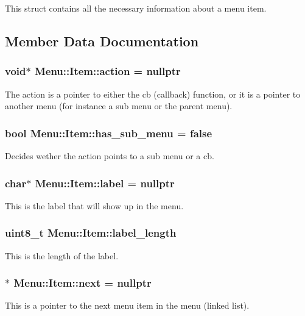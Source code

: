 This struct contains all the necessary information about a menu item. 

\subsection{Member Data Documentation}
\hypertarget{struct_menu_1_1_item_a247e140fed2addf80986ba5a3506b9dd}{
\subsubsection[{action}]{\setlength{\rightskip}{0pt plus 5cm}void$\ast$ Menu\-::\-Item\-::action = nullptr}}\label{struct_menu_1_1_item_a247e140fed2addf80986ba5a3506b9dd}
The action is a pointer to either the cb (callback) function, or it is a pointer to another menu (for instance a sub menu or the parent menu). \hypertarget{struct_menu_1_1_item_a5c9895a137458b9a12dafd447ac7430b}{
\subsubsection[{has\-\_\-sub\-\_\-menu}]{\setlength{\rightskip}{0pt plus 5cm}bool Menu\-::\-Item\-::has\-\_\-sub\-\_\-menu = false}}\label{struct_menu_1_1_item_a5c9895a137458b9a12dafd447ac7430b}
Decides wether the action points to a sub menu or a cb. \hypertarget{struct_menu_1_1_item_a378723382fc64c752a85ffe6fec9707e}{
\subsubsection[{label}]{\setlength{\rightskip}{0pt plus 5cm}char$\ast$ Menu\-::\-Item\-::label = nullptr}}\label{struct_menu_1_1_item_a378723382fc64c752a85ffe6fec9707e}
This is the label that will show up in the menu. \hypertarget{struct_menu_1_1_item_a46749d046bbbde8d5308848d5394c2dc}{
\subsubsection[{label\-\_\-length}]{\setlength{\rightskip}{0pt plus 5cm}uint8\-\_\-t Menu\-::\-Item\-::label\-\_\-length}}\label{struct_menu_1_1_item_a46749d046bbbde8d5308848d5394c2dc}
This is the length of the label. \hypertarget{struct_menu_1_1_item_aadcc1e4e824296c6b72ac7d053f06869}{
\subsubsection[{next}]{$\ast$ Menu\-::\-Item\-::next = nullptr}}\label{struct_menu_1_1_item_aadcc1e4e824296c6b72ac7d053f06869}
This is a pointer to the next menu item in the menu (linked list). 

